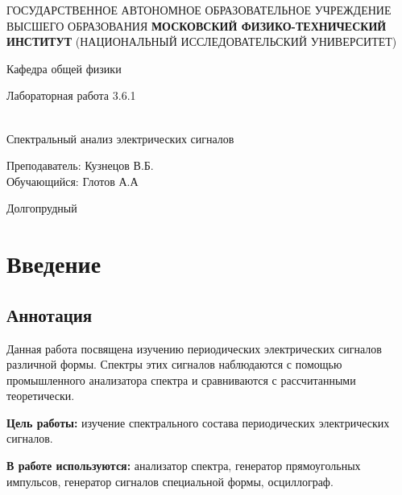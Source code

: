 \documentclass[12pt,a4paper]{article}
\author{Глотов Алексей}
\begin{document}
\newpage
\begin{center}
\footnotesize{{ГОСУДАРСТВЕННОЕ АВТОНОМНОЕ ОБРАЗОВАТЕЛЬНОЕ УЧРЕЖДЕНИЕ}\break
{ВЫСШЕГО ОБРАЗОВАНИЯ}
\break
{\bf {МОСКОВСКИЙ ФИЗИКО-ТЕХНИЧЕСКИЙ ИНСТИТУТ}}
\break
\small{(НАЦИОНАЛЬНЫЙ ИССЛЕДОВАТЕЛЬСКИЙ УНИВЕРСИТЕТ)}}
\break
\hfill \break
\hfill \break
\begin{center}
\normalsize{Кафедра общей физики}
\end{center}
\hfill \break
\hfill \break
\hfill \break
\hfill \break

\begin{center}
\normalsize {Лабораторная работа 3.6.1}
\end{center}
\hfill \break\\
\large{Спектральный анализ электрических сигналов}
\end{center}
\begin{flushleft}
\hfill \break
\hfill \break
\hfill \break
\hfill \break
\hfill \break
\hfill \break
\hfill \break
\hfill \break
\hfill \break
\hfill \break
\hangindent=12cm
\normalsize{Преподаватель:}\hfill
\normalsize{Кузнецов В.Б.}\\
\hfill \break
\normalsize{Обучающийся:}\hfill
\normalsize{Глотов А.А} \\
\hfill \break
\end{flushleft}
\hfill \break
\hfill \break
\hfill \break
\hfill \break
\hfill \break
\hfill \break
\hfill \break
\hfill \break
\hfill \break
\hfill \break
\hfill \break

\begin{center}
Долгопрудный 
\end{center}
\thispagestyle{empty}
\newpage
	
	\section{Введение}

	\subsection{Аннотация}

	Данная работа посвящена изучению периодических электрических сигналов различной формы. Спектры этих сигналов наблюдаются с помощью промышленного анализатора спектра и сравниваются с рассчитанными теоретически.


	\textbf{Цель работы:} изучение спектрального состава периодических электрических сигналов.
	
	
	\textbf{В работе используются:} анализатор спектра, генератор прямоугольных импульсов, генератор сигналов специальной формы, осциллограф.
	
\end{document}
